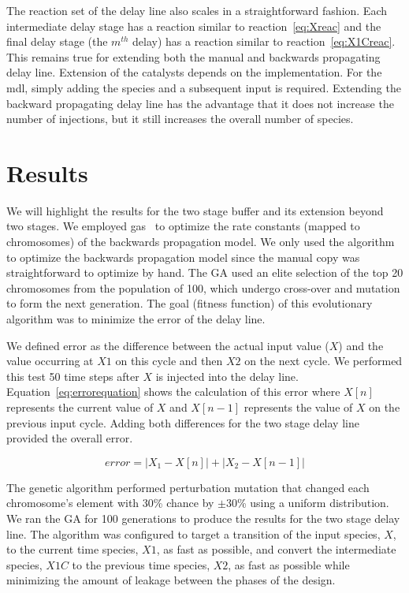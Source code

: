 The reaction set of the delay line also scales in a straightforward fashion. Each intermediate delay stage has a reaction similar to reaction~\ref{eq:Xreac} and the final delay stage (the $m^{th}$ delay) has a reaction similar to reaction~\ref{eq:X1Creac}. This remains true for extending both the manual and backwards propagating delay line. Extension of the catalysts depends on the implementation. For the \gls{mdl}, simply adding the species and a subsequent input is required. Extending the backward propagating delay line has the advantage that it does not increase the number of injections, but it still increases the overall number of species.

\section{Results}
\label{sec:dl_results}
We will highlight the results for the two stage buffer and its extension beyond two stages. We employed \glspl{ga}~\cite{Mitchell1998-tw} to optimize the rate constants (mapped to chromosomes) of the backwards propagation model. We only used the algorithm to optimize the backwards propagation model since the manual copy was straightforward to optimize by hand. The GA used an elite selection of the top 20 chromosomes from the population of 100, which undergo cross-over and mutation to form the next generation. The goal (fitness function) of this evolutionary algorithm was to minimize the error of the delay line.

We defined error as the difference between the actual input value ($X$) and the value occurring at $X1$ on this cycle and then $X2$ on the next cycle. We performed this test 50 time steps after $X$ is injected into the delay line. Equation~\ref{eq:errorequation} shows the calculation of this error where $X[n]$ represents the current value of $X$ and $X[n-1]$ represents the value of $X$ on the previous input cycle. Adding both differences for the two stage delay line provided the overall error.

\begin{equation}
error = |X_1 - X[n]| + |X_2 - X[n-1]| \label{eq:errorequation}
\end{equation}

The genetic algorithm performed perturbation mutation that changed each chromosome's element with 30\% chance by $\pm$30\% using a uniform distribution. We ran the GA for 100 generations to produce the results for the two stage delay line. The algorithm was configured to target a transition of the input species, $X$, to the current time species, $X1$, as fast as possible, and convert the intermediate species, $X1C$ to the previous time species, $X2$, as fast as possible while minimizing the amount of leakage between the phases of the design.

